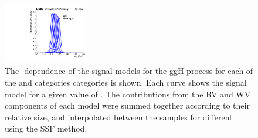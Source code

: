 \begin{figure}[ht!]
\includegraphics[width=0.33\textwidth]{modellingFigures/DCBpG/ggh_VBFTag_2_fmc_interp.pdf} 
\caption{The \mH-dependence of the signal models for the ggH process for each of the \Untagged and \VBFTag categories categories is shown. Each curve shows the signal model for a given value of \mH. The contributions from the RV and WV components of each model were summed together according to their relative size, and interpolated between the samples for different \mH using the SSF method.}

\label{fig:model:sig_interpolation}
\end{figure}

